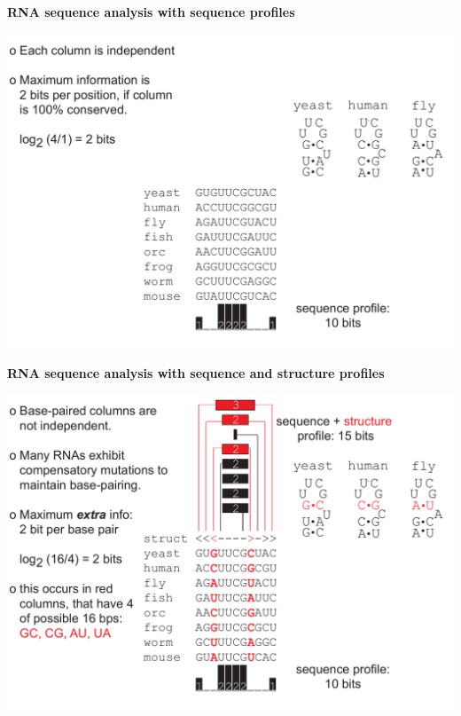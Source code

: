 \documentclass[landscape]{slides}
\begin{document}
\begin{slide}
\begin{center}
\textbf{RNA sequence analysis with sequence profiles}
\end{center}
\medskip

\begin{center}
\includegraphics[width=10.5in]{figs/info_for_alignment_primary}
\end{center}

\end{slide}

\begin{slide}
\begin{center}
\textbf{RNA sequence analysis with sequence and structure profiles}
\end{center}
\medskip

\begin{center}
\includegraphics[width=10.5in]{figs/info_for_alignment_structure}
\end{center}

\end{slide}
\end{document}
